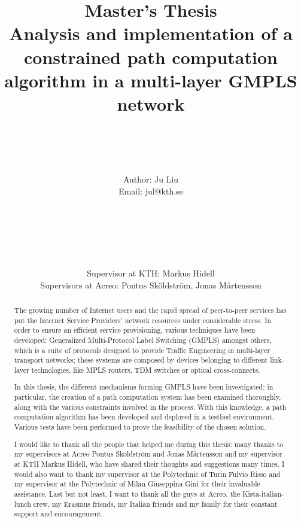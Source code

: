 \documentclass[10pt,a4paper]{report}
\author{\\\\\\\\Author: \Large{Ju Liu} \\ Email: jul@kth.se \\\\\\\\\\\\\\
  Supervisor at KTH: Markus Hidell \\ Supervisors at Acreo: Pontus Sköldström, Jonas
  Mårtensson }
\title{Master's Thesis
  \\ \textbf{Analysis and implementation of a constrained path
    computation algorithm in a multi-layer GMPLS network}}
\begin{document}
\date{}
\maketitle

\thispagestyle{empty}
\begin{abstract}
  The growing number of Internet users and the rapid spread of
  peer-to-peer services has put the Internet Service Providers'
  network resources under considerable stress. In order to ensure an
  efficient service provisioning, various techniques have been
  developed: Generalized Multi-Protocol Label Switching (GMPLS)
  amongst others, which is a suite of protocols designed to provide
  Traffic Engineering in multi-layer transport networks; these systems
  are composed by devices belonging to different link-layer
  technologies, like MPLS routers, TDM switches or optical
  cross-connects.

  In this thesis, the different mechanisms forming GMPLS have been
  investigated: in particular, the creation of a path computation
  system has been examined thoroughly, along with the various
  constraints involved in the process. With this knowledge, a path
  computation algorithm has been developed and deployed in a testbed
  environment. Various tests have been performed to prove the
  feasibility of the chosen solution.
\end{abstract}

\newpage
\def\abstractname{Acknowledgments}
\begin{abstract}\thispagestyle{empty}
  I would like to thank all the people that helped me during this
  thesis: many thanks to my supervisors at Acreo Pontus Sköldström and
  Jonas Mårtensson and my supervisor at KTH Markus Hidell, who have
  shared their thoughts and suggestions many times. I would also want
  to thank my supervisor at the Polytechnic of Turin Fulvio Risso and
  my supervisor at the Polytechnic of Milan Giuseppina Gini for their
  invaluable assistance. Last but not least, I want to thank all the
  guys at Acreo, the Kista-italian-lunch crew, my Erasmus friends, my
  Italian friends and my family for their constant support and
  encouragement.
\end{abstract}

\newpage
{}
\setcounter{page}{3}
\large
\tableofcontents
\newpage
\normalsize
\listoffigures
{} 
\newpage
\listoftables
{} 
\end{document}
